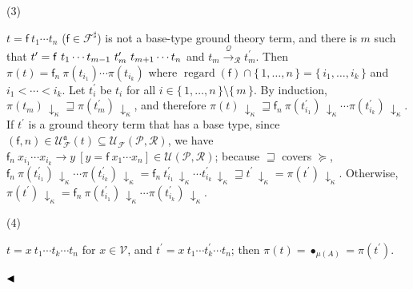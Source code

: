  
 
\par\noindent  (3) 
 
$t={\mathsf{f}}\ {{t}_{1}\cdots{t}_{n}}$ ($\mathsf{f}\in\mathcal{F}^{\sharp}$) is not a base-type ground theory term, and there is $m$ such that $t^{\prime}={{{\mathsf{f}}\ {{t}_{1}\cdots{t}_{m-1}}}\ {t_{m}^{\prime}}}\ {\\
{t}_{m+1}\cdots{t}_{n}}$ and $t_{m}\xrightarrow{\scriptscriptstyle\mathcal{Q}}_{\mathcal{R}}t_{m}^{\prime}$. Then $\pi(t)={\mathsf{f}_{n}}\ {\pi(t_{i_{1}})\cdots\pi(t_{i_{k}})}$ where $\operatorname{regard}(\mathsf{f})\cap\{\,1,\ldots,n\,\}=\{\,{i}_{1},\ldots,{i}_{k}\,\}$ and ${i}_{1}<\cdots<{i}_{k}$. Let $t_{i}^{\prime}$ be $t_{i}$ for all $i\in\{\,1,\ldots,n\,\}\setminus\{\,m\,\}$. By induction, $\pi(t_{m})\,{\downarrow}_{\kappa}\sqsupseteq\pi(t_{m}^{\prime})\,{\downarrow}_{\kappa}$, and therefore $\pi(t)\,{\downarrow}_{\kappa}\sqsupseteq{\mathsf{f}_{n}}\ {\pi(t_{i_{1}}^{\prime})\,{\downarrow}_{\kappa}\cdots\pi(t_{i_{k}}^{\prime})\,{\downarrow}_{\kappa}}$. If $t^{\prime}$ is a ground theory term that has a base type, since $(\mathsf{f},n)\in\mathcal{U}_{\mathcal{F}}^{\mathfrak{a}}(t)\subseteq\mathcal{U}_{\mathcal{F}}(\mathcal{P},\mathcal{R})$, we have ${{\mathsf{f}_{n}}\ {x_{i_{1}}\cdots x_{i_{k}}}}\rightarrow{y}\ [y={\mathsf{f}}\ {{x}_{1}\cdots{x}_{n}}]\in\mathcal{U}(\mathcal{P},\mathcal{R})$; because $\sqsupseteq$ covers $\succeq$, ${\mathsf{f}_{n}}\ {\pi(t_{i_{1}}^{\prime})\,{\downarrow}_{\kappa}\cdots\pi(t_{i_{k}}^{\prime})\,{\downarrow}_{\kappa}}={\mathsf{f}_{n}}\ {t_{i_{1}}^{\prime}\,{\downarrow}_{\kappa}\cdots t_{i_{k}}^{\prime}\,{\downarrow}_{\kappa}}\sqsupseteq t^{\prime}\,{\downarrow}_{\kappa}=\pi(t^{\prime})\,{\downarrow}_{\kappa}$. Otherwise, $\pi(t^{\prime})\,{\downarrow}_{\kappa}={\mathsf{f}_{n}}\ {\pi(t_{i_{1}}^{\prime})\,{\downarrow}_{\kappa}\cdots\pi(t_{i_{k}}^{\prime})\,{\downarrow}_{\kappa}}$.\par
 
 
 
\par\noindent  (4) 
 
$t={x}\ {{t}_{1}\cdots{t}_{k}}\cdots t_{n}$ for $x\in\mathcal{V}$, and $t^{\prime}=x\ t_{1}\cdots t_{k}^{\prime}\cdots t_{n}$; then $\pi(t)=\bullet_{\mu(A)}=\pi(t^{\prime})$.\par
 
 
  
$\hfill\blacktriangleleft$\par
 
